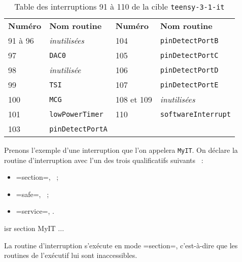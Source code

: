 \begin{table}[!t]
  \small
  \centering
  \begin{tabular}{ll|ll}
    \textbf{Numéro}& \textbf{Nom routine} & \textbf{Numéro}& \textbf{Nom routine} \\
    91 à 96  & \emph{inutilisées} &     104  & \texttt{pinDetectPortB}\\
    97  & \texttt{DAC0}  & 105  & \texttt{pinDetectPortC} \\
    98  & \emph{inutilisée} & 106  & \texttt{pinDetectPortD}\\
    99  & \texttt{TSI} & 107  & \texttt{pinDetectPortE}\\
    100  & \texttt{MCG} & 108 et 109  & \emph{inutilisées}\\
    101  & \texttt{lowPowerTimer} & 110  & \texttt{softwareInterrupt}\\
    103  & \texttt{pinDetectPortA} & &\\
  \end{tabular}
  \caption{Table des interruptions 91 à 110 de la cible \texttt{teensy-3-1-it}}
  \ligne
\end{table}



Prenons l'exemple d'une interruption que l'on appelera \texttt{MyIT}. On déclare la routine d'interruption avec l'un des trois qualificatifs suivants ~:
\begin{itemize}
  \item \plm=section=, ~;
  \item \plm=safe=, ~;
  \item \plm=service=, .
\end{itemize}




\begin{PLM}
isr section MyIT {
  ...
}
\end{PLM}

La routine d'interruption s'exécute en mode \plm=section=, c'est-à-dire que les routines de l'exécutif lui sont inaccessibles. 




